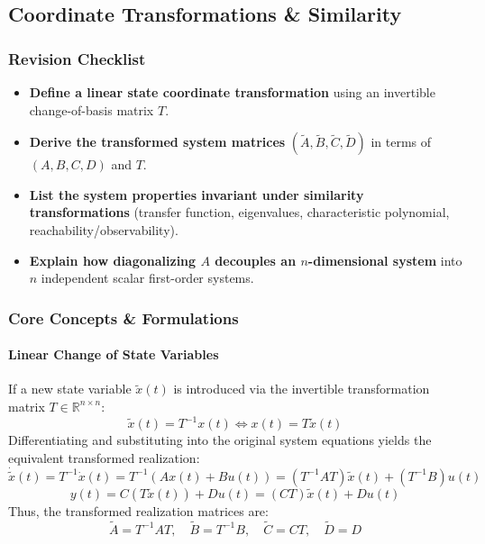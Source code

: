 \documentclass[12pt,onecolumn,twoside ]{article}
\begin{document}
	\subsection{Coordinate Transformations \& Similarity}
	\subsubsection{Revision Checklist}
	\begin{itemize}
		\item[$\square$]
		\textbf{Define a linear state coordinate transformation} using an invertible change-of-basis matrix $T$.
		\item[$\square$]
		\textbf{Derive the transformed system matrices} $(\tilde{A}, \tilde{B}, \tilde{C}, \tilde{D})$ in terms of $(A, B, C, D)$ and $T$.
		\item[$\square$]
		\textbf{List the system properties invariant under similarity transformations} (transfer function, eigenvalues, characteristic polynomial, reachability/observability).
		\item[$\square$]
		\textbf{Explain how diagonalizing $A$ decouples an $n$-dimensional system} into $n$ independent scalar first-order systems.
	\end{itemize}
	
	\subsubsection{Core Concepts \& Formulations}
	\paragraph{Linear Change of State Variables}
	If a new state variable $\tilde{x}(t)$ is introduced via the invertible transformation matrix $T \in \mathbb{R}^{n \times n}$: \[
	\tilde{x}(t) = T^{-1}x(t) \iff x(t) = T\tilde{x}(t)
	\]
	Differentiating and substituting into the original system equations yields the equivalent transformed realization: \[
	\dot{\tilde{x}}(t) = T^{-1}\dot{x}(t) = T^{-1}(Ax(t) + Bu(t)) = (T^{-1}AT)\tilde{x}(t) + (T^{-1}B)u(t)
	\] \[
	y(t) = C(T\tilde{x}(t)) + Du(t) = (CT)\tilde{x}(t) + Du(t)
	\]
	Thus, the transformed realization matrices are: \[
	\tilde{A} = T^{-1}AT, \quad \tilde{B} = T^{-1}B, \quad \tilde{C} = CT, \quad \tilde{D} = D
	\]
\end{document}
